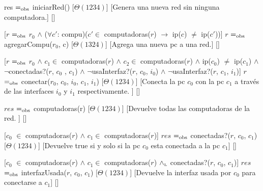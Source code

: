 \begin{Interfaz}
  

  

  {res $=_{\mathrm{obs}}$ iniciarRed()}%
  [$\Theta(1234)$]%
  [Genera una nueva red sin ninguna computadora.]%
  []%
  
  [$r$ $=_{\mathrm{obs}}$ $r_{0}$ $\land$ ($\forall c'$: compu)($c' \in$ computadoras($r$) $\rightarrow$ ip($c$) $\neq$ ip($c'$))]%
  {$r$ $=_{\mathrm{obs}}$ agregarCompu($r_{0}$, c)}%
  [$\Theta(1324)$]%
  [Agrega una nueva pc a una red.]%
  []%

  [$r$ $=_{\mathrm{obs}}$ $r_{0}$ $\land$ $c_{1} \in$ computadoras($r$) $\land$ $c_{2} \in$ computadoras($r$) $\land$ ip($c_{0} $) $\neq$ ip($c_{1}$) $\land$ $\lnot$conectadas?($r$, $c_{0}$ , $c_{1} $) $\land$ $\lnot$usaInterfaz?($r$, $c_{0}$, $i_{0}$) $\land$ $\lnot$usaInterfaz?($r$, $c_{1}$, $i_{1}$)]%
  {$r$ $=_{\mathrm{obs}}$ conectar($r_{0}$, $c_{0}$, $i_{0}$, $c_{1}$, $i_{1}$)}%
  [$\Theta(1234)$]%
  [Conecta la pc $c_{0}$ con la pc $c_{1}$ a trav\'es de las interfaces $i_{0}$ y $i_{1}$ respectivamente. ]%
  []%
  
  {$res$ $=_{\mathrm{obs}}$ computadoras(r)} %
  [$\Theta(1234)$]%
  [Devuelve todas las computadoras de la red. ]%
  []%
  
  [$c_{0}$ $\in$ computadoras($r$) $\land$ $c_{1} \in $ computadoras($r$)]%
  {$res$ $=_{\mathrm{obs}}$ conectadas?($r$, $c_{0}$, $c_{1}$)}%
  [$\Theta(1234)$]%
  [Devuelve true si y solo si la pc $c_{0}$ esta conectada a la pc $c_{1}$]%
  []%
  
  [$c_{0}$ $\in$ computadoras($r$) $\land$ $c_{1} \in $ computadoras($r$) $\land_{\mathrm{\scriptscriptstyle{L}}}$ conectadas?($r$, $c_{0}$, $c_{1}$)]%
  {$res$ $=_{\mathrm{obs}}$ interfazUsada($r$, $c_{0}$, $c_{1}$)}%
  [$\Theta(1234)$]%
  [Devuelve la interfaz usada por $c_{0}$ para conectarse a $c_{1}$]%
  []%
  

\end{Interfaz}
